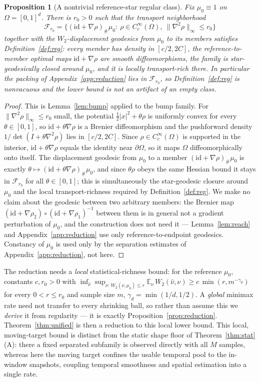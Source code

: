 \documentclass[11pt]{article}
\newtheorem{proposition}{Proposition}
\theoremstyle{definition}
\theoremstyle{remark}
\newcommand{\E}{\mathbb{E}}
\begin{document}
\begin{proposition}[A nontrivial reference-star regular class]\label{prop:regexists}
Fix $\mu_0\equiv1$ on $\Omega=[0,1]^d$. There is $r_0>0$ such that the transport neighborhood
\[
   \mathcal F_{r_0}=\big\{(\mathrm{id}+\nabla\rho)_\#\mu_0:\ \rho\in C_c^\infty(\Omega),\
   \|\nabla^2\rho\|_\infty\le r_0\big\}
\]
together with the $W_2$-displacement geodesics from $\mu_0$ to its members satisfies
Definition~\ref{def:reg}: every member has density in $[c/2,2C]$, the reference-to-member optimal maps
$\mathrm{id}+\nabla\rho$ are smooth diffeomorphisms, the family is star-geodesically closed around
$\mu_0$, and it is locally transport-rich there. In particular the packing of
Appendix~\ref{app:reduction} lies in $\mathcal F_{r_0}$, so Definition~\ref{def:reg} is nonvacuous and
the lower bound is not an artifact of an empty class.
\end{proposition}
\begin{proof}
This is Lemma~\ref{lem:bump} applied to the bump family. For $\|\nabla^2\rho\|_\infty\le r_0$ small,
the potential $\tfrac12|x|^2+\theta\rho$ is uniformly convex for every $\theta\in[0,1]$, so
$\mathrm{id}+\theta\nabla\rho$ is a Brenier diffeomorphism and the pushforward density
$1/\det(I+\theta\nabla^2\rho)$ lies in $[c/2,2C]$. Since $\rho\in C_c^\infty(\Omega)$ is supported in
the interior, $\mathrm{id}+\theta\nabla\rho$ equals the identity near $\partial\Omega$, so it maps
$\Omega$ diffeomorphically onto itself. The displacement geodesic from $\mu_0$ to a member
$(\mathrm{id}+\nabla\rho)_\#\mu_0$ is exactly $\theta\mapsto(\mathrm{id}+\theta\nabla\rho)_\#\mu_0$,
and since $\theta\rho$ obeys the same Hessian bound it stays in $\mathcal F_{r_0}$ for all
$\theta\in[0,1]$; this is simultaneously the star-geodesic closure around $\mu_0$ and the local
transport-richness required by Definition~\ref{def:reg}. We make no claim about the geodesic between
two arbitrary members: the Brenier map $(\mathrm{id}+\nabla\rho_2)\circ(\mathrm{id}+\nabla\rho_1)^{-1}$
between them is in general not a gradient perturbation of $\mu_0$, and the construction does not need
it --- Lemma~\ref{lem:reach} and Appendix~\ref{app:reduction} use only reference-to-endpoint
geodesics. Constancy of $\mu_0$ is used only by the separation estimates of
Appendix~\ref{app:reduction}, not here.
\end{proof}

\noindent The reduction needs a \emph{local} statistical-richness bound: for the reference $\mu_0$,
constants $c,r_0>0$ with
$\inf_{\hat\nu}\sup_{\nu:\,W_2(\nu,\mu_0)\le r}\E_\nu\,W_2(\hat\nu,\nu)\ge c\,\min(r,m^{-\gamma_d})$
for every $0<r\le r_0$ and sample size $m$, $\gamma_d=\min(1/d,1/2)$. A \emph{global} minimax rate
need not transfer to every shrinking ball, so rather than assume this we \emph{derive} it from
regularity --- it is exactly Proposition~\ref{prop:reduction}. Theorem~\ref{thm:unified} is then a
reduction to this local lower bound. This local, moving-target bound is distinct from the static shape
floor of Theorem~\ref{thm:stat}(A): there a fixed separated subfamily is observed directly with all
$M$ samples, whereas here the moving target confines the usable temporal pool to the in-window
snapshots, coupling temporal smoothness and spatial estimation into a single rate.
\end{document}
